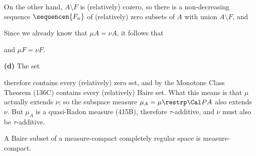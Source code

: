 {

\noindent On the other hand, $A\setminus F$ is (relatively) cozero, so
there is a non-decreasing sequence $\sequencen{F_n}$ of (relatively)
zero
subsets of $A$ with union $A\setminus F$, and


\noindent Since we already know that $\mu A=\nu A$, it follows that


\noindent and $\mu F=\nu F$.\ \Qed

\medskip

{\bf (d)} The set


\noindent therefore contains every (relatively) zero set, and by the
Monotone Class Theorem (136C) contains every (relatively) Baire set.
What this means is that $\mu$ actually extends $\nu$;  so the subspace
measure $\mu_A=\mu\restrp\Cal PA$ also extends $\nu$.   But $\mu_A$ is a
quasi-Radon measure (415B), therefore $\tau$-additive, and $\nu$ must
also be $\tau$-additive.
}%

 A Baire subset of a measure-compact completely
regular space is measure-compact.


